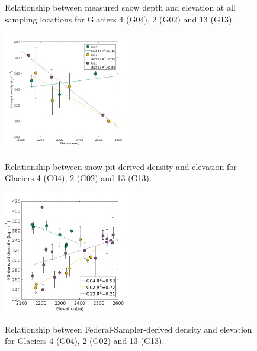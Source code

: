 \documentclass{sfuthesis}
\begin{document}
\begin{figure}[H]
	\caption[Relationship between measured snow depth and elevation at all sampling locations for study glaciers]{Relationship between measured snow depth and elevation at all sampling locations for Glaciers 4 (G04), 2 (G02) and 13 (G13).}
	\label{fig:depth_elev}
\end{figure}


\begin{figure}[H]
	\centering
	\includegraphics[width = 0.5\textwidth]{ElevationVsSnowpit_all.png}\\
	\caption[Relationship between snow-pit-derived density and elevation for study glaciers]{Relationship between snow-pit-derived density and elevation for Glaciers 4 (G04), 2 (G02) and 13 (G13).}
	\label{fig:elev_snowpit}
\end{figure}


\begin{figure}[H]
	\centering
	\includegraphics[width = 0.5\textwidth]{ElevationVsSWEtube_all.png}\\
	\caption[Relationship between Federal-Sampler-derived density and elevation for study glaciers]{Relationship between Federal-Sampler-derived density and elevation for Glaciers 4 (G04), 2 (G02) and 13 (G13).}
	\label{fig:elev_tube}
\end{figure}
\end{document}
